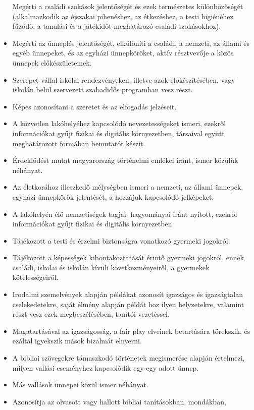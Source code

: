 \begin{itemize}
  Megérti a családi szokások jelentőségét és ezek természetes
  különbözőségét (alkalmazkodik az éjszakai pihenéshez, az étkezéshez, a
  testi higiénéhez fűződő, a tanulási és a játékidőt meghatározó családi
  szokásokhoz).
\item
  Megérti az ünneplés jelentőségét, elkülöníti a családi, a nemzeti, az
  állami és egyéb ünnepeket, és az egyházi ünnepköröket, aktív
  résztvevője a közös ünnepek előkészületeinek.
\item
  Szerepet vállal iskolai rendezvényeken, illetve azok előkészítésében,
  vagy iskolán belül szervezett szabadidős programban vesz részt.
\item
  Képes azonosítani a szeretet és az elfogadás jelzéseit.
\item
  A közvetlen lakóhelyéhez kapcsolódó nevezetességeket ismeri, ezekről
  információkat gyűjt fizikai és digitális környezetben, társaival
  együtt meghatározott formában bemutatót készít.
\item
  Érdeklődést mutat magyarország történelmi emlékei iránt, ismer közülük
  néhányat.
\item
  Az életkorához illeszkedő mélységben ismeri a nemzeti, az állami
  ünnepek, egyházi ünnepkörök jelentését, a hozzájuk kapcsolódó
  jelképeket.
\item
  A lakóhelyén élő nemzetiségek tagjai, hagyományai iránt nyitott,
  ezekről információkat gyűjt fizikai és digitális környezetben.
\item
  Tájékozott a testi és érzelmi biztonságra vonatkozó gyermeki jogokról.
\item
  Tájékozott a képességek kibontakoztatását érintő gyermeki jogokról,
  ennek családi, iskolai és iskolán kívüli következményeiről, a
  gyermekek kötelességeiről.
\item
  Irodalmi szemelvények alapján példákat azonosít igazságos és
  igazságtalan cselekedetekre, saját élmény alapján példát hoz ilyen
  helyzetekre, valamint részt vesz ezek megbeszélésében, tanítói
  vezetéssel.
\item
  Magatartásával az igazságosság, a fair play elveinek betartására
  törekszik, és ezáltal igyekszik mások bizalmát elnyerni.
\item
  A bibliai szövegekre támaszkodó történetek megismerése alapján
  értelmezi, milyen vallási eseményhez kapcsolódik egy-egy adott ünnep.
\item
  Más vallások ünnepei közül ismer néhányat.
\item
  Azonosítja az olvasott vagy hallott bibliai tanításokban, mondákban,

\end{itemize}
